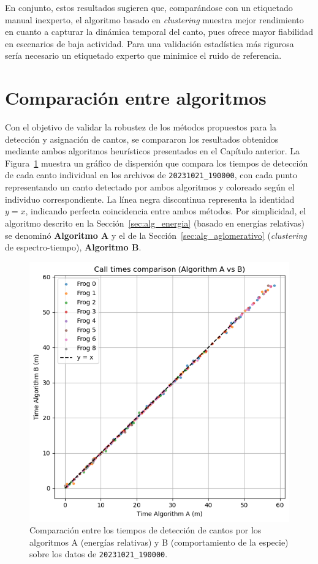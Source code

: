 En conjunto, estos resultados sugieren que, comparándose con 
un etiquetado manual inexperto, el algoritmo basado en \textit{clustering}
muestra mejor rendimiento en cuanto a capturar la dinámica temporal del canto, 
pues ofrece mayor fiabilidad en escenarios de baja 
actividad. Para una validación estadística más rigurosa sería 
necesario un etiquetado experto que minimice el ruido de 
referencia.


\section{Comparación entre algoritmos}
\label{sec:res_comparacion}


Con el objetivo de validar la robustez de los métodos propuestos 
para la detección y asignación de cantos, se compararon los 
resultados obtenidos mediante ambos algoritmos heurísticos 
presentados en el Capítulo anterior. 
La Figura~\ref{fig:alg_comparison} muestra un gráfico de 
dispersión que compara los tiempos de detección de cada canto 
individual en los archivos de \texttt{20231021\_190000}, con cada 
punto representando un canto detectado por ambos algoritmos y 
coloreado según el individuo correspondiente. La línea negra 
discontinua representa la identidad \( y = x \), indicando 
perfecta coincidencia entre ambos métodos. Por simplicidad,
el algoritmo descrito en la Sección~\ref{sec:alg_energia} (basado en energías relativas) 
se denominó \textbf{Algoritmo A} y el de la Sección~\ref{sec:alg_aglomerativo} (\emph{clustering} de espectro-tiempo),
\textbf{Algoritmo B}.

\begin{figure}[ht]
    \centering
    \includegraphics[width=0.7\linewidth]{Graphics/times_comparison.png}
    \caption{Comparación entre los tiempos de detección de cantos por los algoritmos A (energías relativas) y B (comportamiento de la especie) sobre los datos de \texttt{20231021\_190000}.}
    \label{fig:alg_comparison}
\end{figure}

